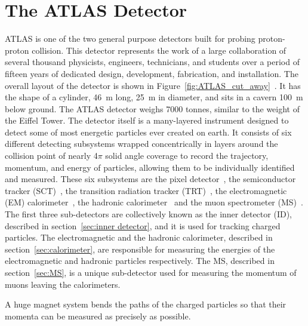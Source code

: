 \section{The ATLAS Detector}

ATLAS is one of the two general purpose detectors built for probing proton-proton 
collision. This detector represents the work of a large collaboration 
of several thousand physicists, engineers, technicians,
and students over a period of fifteen years of dedicated 
design, development, fabrication, and installation.
The overall layout of the detector is shown in Figure~\ref{fig:ATLAS_cut_away}~\cite{PERF-2007-01}.
It has the shape of a cylinder, 46~m long, 25~m in diameter, 
and sits in a cavern 100~m below ground. The ATLAS detector weighs 7000 tonnes, 
similar to the weight of the Eiffel Tower.
The detector itself is a many-layered instrument designed to detect some 
of most energetic particles ever created on earth. 
It consists of six different detecting subsystems wrapped concentrically 
in layers around the collision point of nearly 4$\pi$ solid angle coverage
to record the trajectory, momentum, and energy of particles, 
allowing them to be individually identified and measured. 
These six subsystems are 
the pixel detector~\cite{ATLAS-TDR-11}, 
the semiconductor tracker (SCT)~\cite{ATLAS-TDR-04}, 
the transition radiation tracker (TRT)~\cite{ATLAS-TDR-04},
the electromagnetic (EM) calorimeter~\cite{ATLAS-TDR-02}, 
the hadronic calorimeter~\cite{ATLAS-TDR-03}
and the muon spectrometer (MS)~\cite{ATLAS-TDR-10}.
The first three sub-detectors are collectively known as the inner detector (ID),
described in section~\ref{sec:inner detector}, and it is used for tracking charged particles. 
The electromagnetic and the hadronic calorimeter, described in section~\ref{sec:calorimeter},
are responsible for measuring the energies of the electromagnetic and hadronic particles respectively. 
The MS, described in section~\ref{sec:MS}, is a unique sub-detector used for measuring the 
momentum of muons leaving the calorimeters.

A huge magnet system bends the paths of the charged particles so that their 
momenta can be measured as precisely as possible.

